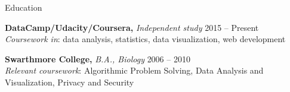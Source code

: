 \documentclass{resume} %
\begin{document}

\begin{rSection}{Education}
\vspace{0.3em}

{\bf DataCamp/Udacity/Coursera, }{\em Independent study} \hfill 2015 -- Present \\ 
{\em Coursework in}: data analysis, statistics, data visualization, web development

{\bf Swarthmore College, }{\em B.A., Biology } \hfill 2006 -- 2010 \\
{\em Relevant coursework}: Algorithmic Problem Solving, Data Analysis and Visualization, Privacy and Security
\end{rSection}







\end{document}
